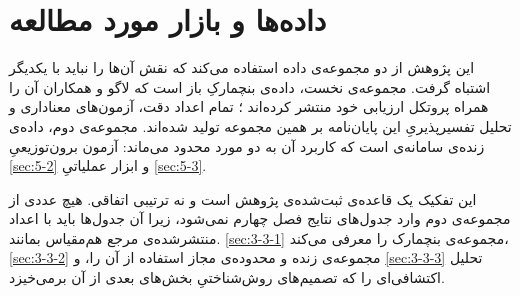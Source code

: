 
\section{داده‌ها و بازار مورد مطالعه}
\label{sec:3-3}

این پژوهش از دو مجموعه‌ی داده استفاده می‌کند که نقش آن‌ها را نباید با یکدیگر اشتباه
گرفت. مجموعه‌ی نخست، داده‌ی بنچمارکِ باز  است که لاگو و همکاران آن را همراه
پروتکل ارزیابی خود منتشر کرده‌اند \cite{lago_forecasting_2021}؛ تمام اعداد دقت،
آزمون‌های معناداری و تحلیل تفسیرپذیریِ این پایان‌نامه بر همین مجموعه تولید شده‌اند.
مجموعه‌ی دوم، داده‌ی زنده‌ی سامانه‌ی  است که کاربرد آن به دو مورد محدود
می‌ماند: آزمون برون‌توزیعیِ \cref{sec:5-2} و ابزار عملیاتیِ \cref{sec:5-3}.

این تفکیک یک قاعده‌ی ثبت‌شده‌ی پژوهش است و نه ترتیبی اتفاقی. هیچ عددی از مجموعه‌ی دوم
وارد جدول‌های نتایج فصل چهارم نمی‌شود، زیرا آن جدول‌ها باید با اعداد منتشرشده‌ی مرجع
هم‌مقیاس بمانند. \cref{sec:3-3-1} مجموعه‌ی بنچمارک را معرفی می‌کند، \cref{sec:3-3-2} مجموعه‌ی زنده و
محدوده‌ی مجاز استفاده از آن را، و \cref{sec:3-3-3} تحلیل اکتشافی‌ای را که تصمیم‌های
روش‌شناختیِ بخش‌های بعدی از آن برمی‌خیزد.
